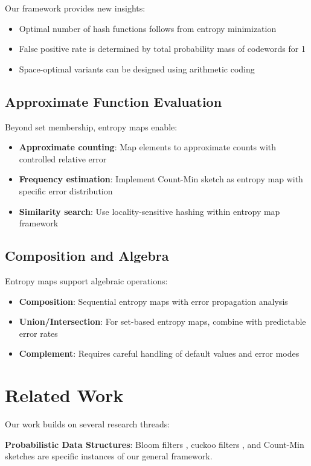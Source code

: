 \documentclass[11pt]{article}
\begin{document}
Our framework provides new insights:
\begin{itemize}
\item Optimal number of hash functions follows from entropy minimization
\item False positive rate is determined by total probability mass of codewords for 1
\item Space-optimal variants can be designed using arithmetic coding
\end{itemize}

\subsection{Approximate Function Evaluation}

Beyond set membership, entropy maps enable:
\begin{itemize}
\item \textbf{Approximate counting}: Map elements to approximate counts with controlled relative error
\item \textbf{Frequency estimation}: Implement Count-Min sketch as entropy map with specific error distribution
\item \textbf{Similarity search}: Use locality-sensitive hashing within entropy map framework
\end{itemize}

\subsection{Composition and Algebra}

Entropy maps support algebraic operations:
\begin{itemize}
\item \textbf{Composition}: Sequential entropy maps with error propagation analysis
\item \textbf{Union/Intersection}: For set-based entropy maps, combine with predictable error rates
\item \textbf{Complement}: Requires careful handling of default values and error modes
\end{itemize}

\section{Related Work}

Our work builds on several research threads:

\textbf{Probabilistic Data Structures}: Bloom filters \cite{bloom1970}, cuckoo filters \cite{fan2014}, and Count-Min sketches \cite{cormode2005} are specific instances of our general framework.
\end{document}
